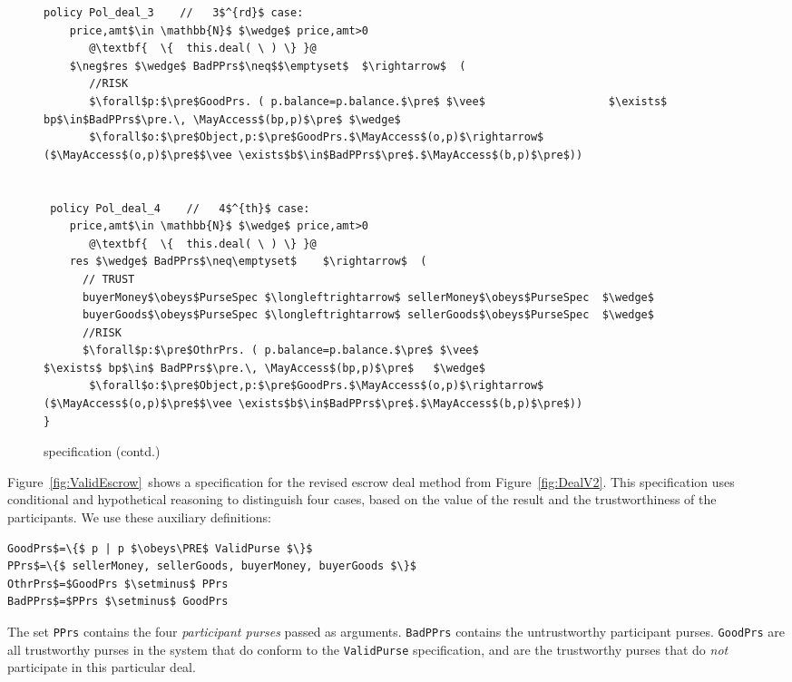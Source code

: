 \begin{figure*}[htb]
\begin{lstlisting}[escapechar=@,firstnumber=38]
 policy Pol_deal_3    //   3$^{rd}$ case:
    price,amt$\in \mathbb{N}$ $\wedge$ price,amt>0
       @\textbf{  \{  this.deal( \ ) \} }@
    $\neg$res $\wedge$ BadPPrs$\neq$$\emptyset$  $\rightarrow$  (
       //RISK
       $\forall$p:$\pre$GoodPrs. ( p.balance=p.balance.$\pre$ $\vee$                   $\exists$ bp$\in$BadPPrs$\pre.\, \MayAccess$(bp,p)$\pre$ $\wedge$
       $\forall$o:$\pre$Object,p:$\pre$GoodPrs.$\MayAccess$(o,p)$\rightarrow$                    ($\MayAccess$(o,p)$\pre$$\vee \exists$b$\in$BadPPrs$\pre$.$\MayAccess$(b,p)$\pre$))


 policy Pol_deal_4    //   4$^{th}$ case:
    price,amt$\in \mathbb{N}$ $\wedge$ price,amt>0
       @\textbf{  \{  this.deal( \ ) \} }@
    res $\wedge$ BadPPrs$\neq\emptyset$    $\rightarrow$  (
      // TRUST
      buyerMoney$\obeys$PurseSpec $\longleftrightarrow$ sellerMoney$\obeys$PurseSpec  $\wedge$
      buyerGoods$\obeys$PurseSpec $\longleftrightarrow$ sellerGoods$\obeys$PurseSpec  $\wedge$
      //RISK
      $\forall$p:$\pre$OthrPrs. ( p.balance=p.balance.$\pre$ $\vee$                                  $\exists$ bp$\in$ BadPPrs$\pre.\, \MayAccess$(bp,p)$\pre$   $\wedge$
       $\forall$o:$\pre$Object,p:$\pre$GoodPrs.$\MayAccess$(o,p)$\rightarrow$                   ($\MayAccess$(o,p)$\pre$$\vee \exists$b$\in$BadPPrs$\pre$.$\MayAccess$(b,p)$\pre$))
}
\end{lstlisting}
\vspace*{-7mm}
\caption{ specification (contd.)}
\end{figure*}


Figure~\ref{fig:ValidEscrow}~shows a specification for the revised
escrow deal method from Figure~\ref{fig:DealV2}.  This specification
uses conditional and hypothetical reasoning to
distinguish four cases, based on the value of the result and
the trustworthiness of the participants.
%
We use these auxiliary definitions:
%
\begin{lstlisting}[numbers=none,frame=none,rulecolor=\color{white}]
GoodPrs$=\{$ p | p $\obeys\PRE$ ValidPurse $\}$
PPrs$=\{$ sellerMoney, sellerGoods, buyerMoney, buyerGoods $\}$
OthrPrs$=$GoodPrs $\setminus$ PPrs
BadPPrs$=$PPrs $\setminus$ GoodPrs
\end{lstlisting}
%
\vspace*{-2ex}
%
\noindent The set \lstinline{PPrs} contains the four \emph{participant purses}
passed as arguments.
\lstinline{BadPPrs} contains the untrustworthy participant purses.
\lstinline{GoodPrs} are all trustworthy purses in the system
that do conform to the \lstinline{ValidPurse} specification, and
 are the trustworthy purses that do
\textit{not} participate in this particular deal.

